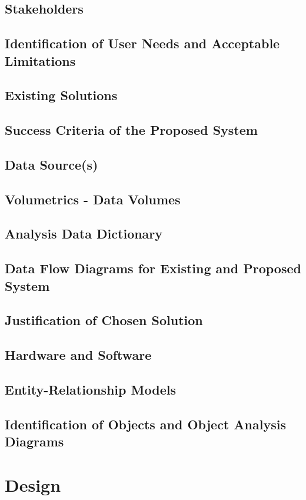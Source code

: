 \documentclass[11pt]{article}
\begin{document}
        \subsection{Stakeholders}
        \subsection{Identification of User Needs and Acceptable Limitations}
        \subsection{Existing Solutions}
        \subsection{Success Criteria of the Proposed System}
        \subsection{Data Source(s)}
        \subsection{Volumetrics - Data Volumes}
        \subsection{Analysis Data Dictionary}
        \subsection{Data Flow Diagrams for Existing and Proposed System}
        \subsection{Justification of Chosen Solution}
        \subsection{Hardware and Software}
        \subsection{Entity-Relationship Models}
        \subsection{Identification of Objects and Object Analysis Diagrams}

    \section{Design}
\end{document}
